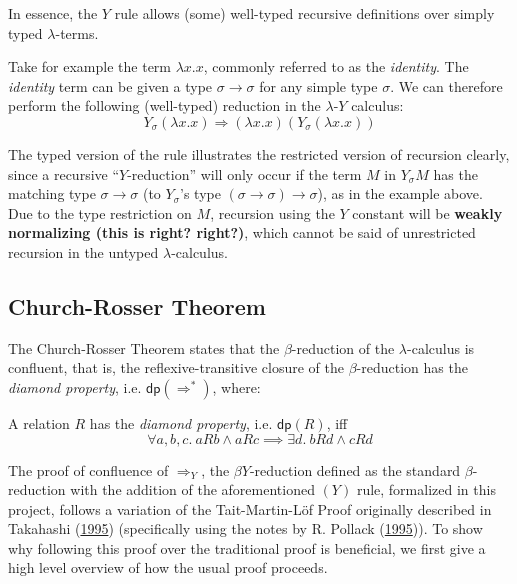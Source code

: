 \documentclass[a4paper, 12pt, twoside]{style/ociamthesis}
\theoremstyle{plain}
\theoremstyle{definition}
\newtheorem{Definition}{Definition}[chapter]
\newtheorem{Example}{Example}[chapter]
\theoremstyle{remark}
\newcommand{\lamy}{\lambda\text{-}Y}
\newcommand{\dip}{\textsf{dp}}
\renewenvironment{Example}{\begin{OldExample}\begin{mdframed}[style=example, linecolor=yellow]}{\end{mdframed}\end{OldExample}}
\renewenvironment{Definition}{\begin{OldDefinition}\begin{mdframed}[style=example, linecolor=cyan]}{\end{mdframed}\end{OldDefinition}}
\begin{document}
In essence, the \(Y\) rule allows (some) well-typed recursive
definitions over simply typed \(\lambda\)-terms.

\begin{Example}

Take for example the term \(\lambda x.x\), commonly referred to as the
\emph{identity}. The \emph{identity} term can be given a type
\(\sigma \to \sigma\) for any simple type \(\sigma\). We can therefore
perform the following (well-typed) reduction in the \(\lamy\) calculus:
\[Y_\sigma (\lambda x.x) \Rightarrow (\lambda x.x)(Y_\sigma (\lambda x.x))\]

\end{Example}

The typed version of the rule illustrates the restricted version of
recursion clearly, since a recursive ``\(Y\)-reduction'' will only occur
if the term \(M\) in \(Y_\sigma M\) has the matching type
\(\sigma \to \sigma\) (to \(Y_\sigma\)'s type
\((\sigma \to \sigma) \to \sigma\)), as in the example above. Due to the
type restriction on \(M\), recursion using the \(Y\) constant will be
\textbf{weakly normalizing (this is right? right?)}, which cannot be
said of unrestricted recursion in the untyped \(\lambda\)-calculus.

\subsection{Church-Rosser Theorem}\label{church-rosser-theorem}

\label{cr-def}

The Church-Rosser Theorem states that the \(\beta\)-reduction of the
\(\lambda\)-calculus is confluent, that is, the reflexive-transitive
closure of the \(\beta\)-reduction has the \emph{diamond property}, i.e.
\(\dip(\Rightarrow^*)\), where:

\begin{Definition}[$\dip(R)$]

A relation \(R\) has the \emph{diamond property}, i.e. \(\dip(R)\), iff
\[\forall a, b, c.\ aRb \land aRc \implies \exists d.\ bRd \land cRd\]

\end{Definition}

The proof of confluence of \(\Rightarrow_Y\), the \(\beta Y\)-reduction
defined as the standard \(\beta\)-reduction with the addition of the
aforementioned \((Y)\) rule, formalized in this project, follows a
variation of the Tait-Martin-Löf Proof originally described in Takahashi
(\protect\hyperlink{ref-takahashi95}{1995}) (specifically using the
notes by R. Pollack (\protect\hyperlink{ref-pollack95}{1995})). To show
why following this proof over the traditional proof is beneficial, we
first give a high level overview of how the usual proof proceeds.
\end{document}
